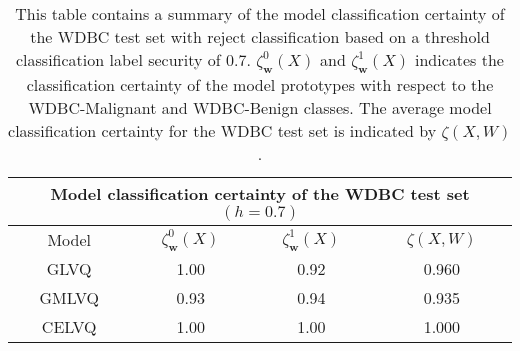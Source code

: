 \begin{table}[H]
	\centering
	\begin{tabular}{ |c|c|c|c|  }
		\hline
		\multicolumn{4}{|c|}{Model classification certainty of the WDBC test set $ (h=0.7)$} \\
		\hline
		Model &$\zeta_{\mathbf{w}}^{0}(X) $ & $\zeta_{\mathbf{w}}^{1}(X)$ & $\zeta(X,W)$ \\
		\hline
		GLVQ  &1.00  &0.92   &0.960   \\
		GMLVQ &0.93  & 0.94   &0.935  \\
		CELVQ &1.00  &1.00   &1.000   \\	
		\hline
	\end{tabular}
	\caption[Summary of model classification certainty of the WDBC test set with threshold security]{\label{tab:WDBC certainty_}This table contains a summary of the model classification certainty of the WDBC test set with reject classification based on a threshold classification label security of 0.7.\hspace{2pt} $\zeta_{\mathbf{w}}^{0}(X) $\hspace{2pt} and\hspace{2pt} $\zeta_{\mathbf{w}}^{1}(X)$ \hspace{2pt} indicates the classification certainty of the model prototypes with respect to the WDBC-Malignant and WDBC-Benign classes. The average model classification certainty for the WDBC test set is indicated by\hspace{2pt} $\zeta(X,W)$.}
\end{table}

